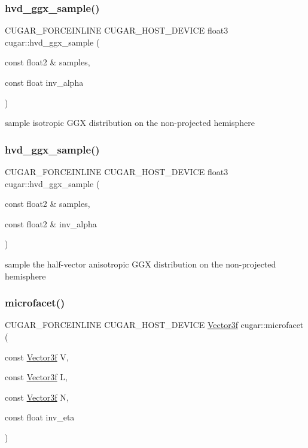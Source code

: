 \subsubsection{\texorpdfstring{hvd\+\_\+ggx\+\_\+sample()}{hvd\_ggx\_sample()}\hspace{0.1cm}{\footnotesize\ttfamily [1/2]}}
{\footnotesize\ttfamily C\+U\+G\+A\+R\+\_\+\+F\+O\+R\+C\+E\+I\+N\+L\+I\+NE C\+U\+G\+A\+R\+\_\+\+H\+O\+S\+T\+\_\+\+D\+E\+V\+I\+CE float3 cugar\+::hvd\+\_\+ggx\+\_\+sample (\begin{DoxyParamCaption}\item[{const float2 \&}]{samples,  }\item[{const float}]{inv\+\_\+alpha }\end{DoxyParamCaption})}

sample isotropic G\+GX distribution on the non-\/projected hemisphere \mbox{\label{group___b_s_d_f_module_gaa94fad7af98e50d2b2abe6801df8bd93}} 
\subsubsection{\texorpdfstring{hvd\+\_\+ggx\+\_\+sample()}{hvd\_ggx\_sample()}\hspace{0.1cm}{\footnotesize\ttfamily [2/2]}}
{\footnotesize\ttfamily C\+U\+G\+A\+R\+\_\+\+F\+O\+R\+C\+E\+I\+N\+L\+I\+NE C\+U\+G\+A\+R\+\_\+\+H\+O\+S\+T\+\_\+\+D\+E\+V\+I\+CE float3 cugar\+::hvd\+\_\+ggx\+\_\+sample (\begin{DoxyParamCaption}\item[{const float2 \&}]{samples,  }\item[{const float2 \&}]{inv\+\_\+alpha }\end{DoxyParamCaption})}

sample the half-\/vector anisotropic G\+GX distribution on the non-\/projected hemisphere \mbox{\label{group___b_s_d_f_module_gae47d332728711dde1d05b721b74267f7}} 
\subsubsection{\texorpdfstring{microfacet()}{microfacet()}}
{\footnotesize\ttfamily C\+U\+G\+A\+R\+\_\+\+F\+O\+R\+C\+E\+I\+N\+L\+I\+NE C\+U\+G\+A\+R\+\_\+\+H\+O\+S\+T\+\_\+\+D\+E\+V\+I\+CE \hyperlink{structcugar_1_1_vector}{Vector3f} cugar\+::microfacet (\begin{DoxyParamCaption}\item[{const \hyperlink{structcugar_1_1_vector}{Vector3f}}]{V,  }\item[{const \hyperlink{structcugar_1_1_vector}{Vector3f}}]{L,  }\item[{const \hyperlink{structcugar_1_1_vector}{Vector3f}}]{N,  }\item[{const float}]{inv\+\_\+eta }\end{DoxyParamCaption})}

